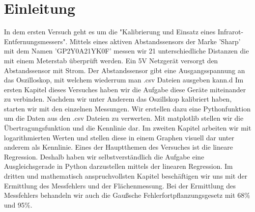 \documentclass[12pt, oneside, a4paper, \docLanguage]{report}
\begin{document}

\setcounter{section}{0}



\clearpage

%
%


%
%


%
%


%
%




\setcounter{page}{1} 
\pagestyle{default}
%
%
\chapter{Einleitung}
\label{chap:EINL}
In dem ersten Versuch geht es um die "Kalibrierung und Einsatz eines Infrarot-Entfernungsmessers". Mittels eines aktiven Abstandssensors der Marke 'Sharp' mit dem Namen 'GP2Y0A21YK0F'  messen wir 21 unterschiedliche Distanzen die mit einem Meterstab überprüft werden.
\newline
\newline
Ein 5V Netzgerät versorgt den Abstandssensor mit Strom. Der Abstandssensor gibt eine Ausgangsspannung an das Oszilloskop, mit welchem wiederrum man .csv Dateien ausgeben kann.d
Im ersten Kapitel dieses Versuches haben wir die Aufgabe diese Geräte miteinander zu verbinden.
Nachdem wir unter Anderem das Oszillskop kalibriert haben, starten wir mit den einzelnen Messungen.
Wir erstellen dazu eine Pythonfunktion um die Daten aus den .csv Dateien zu verwerten. 
\newline
\newline
Mit matplotlib stellen wir die Übertragungsfunktion und die Kennlinie dar. 
Im zweiten Kapitel arbeiten wir mit logarithmierten Werten und stellen diese in einem Graphen visuell dar unter anderem als Kennlinie.
\newline
Eines der Hauptthemen des Versuches ist die lineare Regression.
\newline
\newline
Deshalb haben wir selbstverständlich die Aufgabe eine Ausgleichsgerade in Python darzustellen mittels der linearen Regression.
Im dritten und mathematisch anspruchvollsten Kapitel beschäftigen wir uns mit der Ermittlung des Messfehlers und der Flächenmessung.
Bei der Ermittlung des Messfehlers behandeln wir auch die Gaußsche Fehlerfortpflanzungsgesetz mit 68\% und 95\%.
\end{document}
